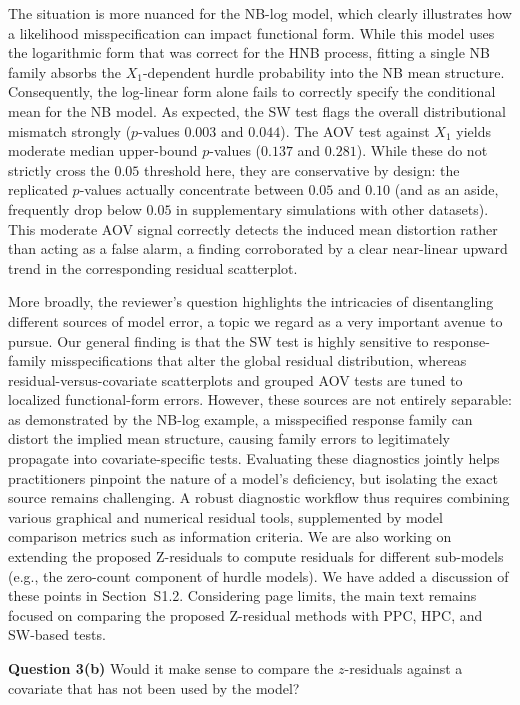 \documentclass[11pt]{article}
\newcommand*{\mybox}[2]{%
  \par\medskip\noindent
  \colorbox{#1!30}{\parbox{.98\linewidth}{#2}}%
  \par\medskip
}
\begin{document}
The situation is more nuanced for the NB-log model, which clearly
illustrates how a likelihood misspecification can impact functional form.
While this model uses the logarithmic form that was correct for the HNB
process, fitting a single NB family absorbs the $X_1$-dependent hurdle
probability into the NB mean structure. Consequently, the log-linear form
alone fails to correctly specify the conditional mean for the NB model.
As expected, the SW test flags the overall distributional mismatch strongly
($p$-values $0.003$ and $0.044$). The AOV test against $X_1$ yields moderate
median upper-bound $p$-values ($0.137$ and $0.281$). While these do not strictly
cross the $0.05$ threshold here, they are conservative by design: the
replicated $p$-values actually concentrate between $0.05$ and $0.10$ (and as an
aside, frequently drop below $0.05$ in supplementary simulations with other
datasets). This moderate AOV signal correctly detects the induced mean
distortion rather than acting as a false alarm, a finding corroborated by a
clear near-linear upward trend in the corresponding residual scatterplot.

More broadly, the reviewer's question highlights the intricacies of
disentangling different sources of model error, a topic we regard as a
very important avenue to pursue. Our general finding is that the SW test
is highly sensitive to response-family misspecifications that alter the
global residual distribution, whereas residual-versus-covariate
scatterplots and grouped AOV tests are tuned to localized functional-form
errors. However, these sources are not entirely separable: as demonstrated
by the NB-log example, a misspecified response family can distort the
implied mean structure, causing family errors to legitimately propagate
into covariate-specific tests. Evaluating these diagnostics jointly helps
practitioners pinpoint the nature of a model's deficiency, but isolating
the exact source remains challenging. A robust diagnostic workflow thus
requires combining various graphical and numerical residual tools,
supplemented by model comparison metrics such as information criteria. We
are also working on extending the proposed Z-residuals to compute
residuals for different sub-models (e.g., the zero-count component of
hurdle models). We have added a discussion of these points in Section~S1.2.
Considering page limits, the main text remains focused on comparing the
proposed Z-residual methods with PPC, HPC, and SW-based tests.

\medskip

\mybox{gray}{\textbf{Question 3(b)} Would it make sense to compare the $z$-residuals against a covariate that has not been used by the model?}
\end{document}
